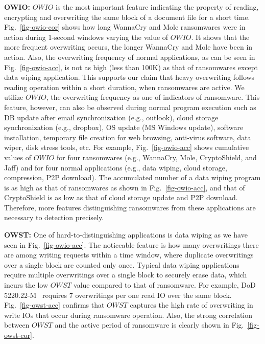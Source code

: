 \documentclass[conference]{IEEEtran}
\newcommand{\eg}{e.g.,\xspace}
\begin{document}
{\bf OWIO:} $OWIO$ is the most important feature indicating the property of reading, encrypting and overwriting 
the same block of a document file for a short time. 
Fig.~\ref{fig-owio-cor} shows how long WannaCry and Mole ransomwares were in action 
during 1-second windows varying the value of $OWIO$. 
It shows that the more frequent overwriting occurs, the longer WannaCry and Mole have been in action.
Also, the overwriting frequency of normal applications, as can be seen in Fig.~\ref{fig-owio-acc}, 
is not as high (less than 100K) as that of ransomwares except data wiping application. 
This supports our claim that heavy overwriting follows reading operation within a short duration,
when ransomwares are active. We utilize $OWIO$, the overwriting frequency as one of indicators of ransomware.
This feature, however, can also be observed during normal program execution such as DB update
after email synchronization (\eg outlook), cloud storage synchronization (\eg dropbox),
OS update (MS Windows update), software installation, temporary file creation for web browsing,
anti-virus software, data wiper, disk stress tools, etc. For example, 
Fig.~\ref{fig-owio-acc} shows cumulative values
of $OWIO$ for four ransomwares (\eg WannaCry, Mole, CryptoShield, and Jaff) 
and for four normal applications (\eg data wiping, cloud storage, compression, P2P download).
The accumulated number of a data wiping program is 
as high as that of ransomwares as shown in Fig.~\ref{fig-owio-acc},
and that of CryptoShield is as low as that of cloud storage update and P2P download.
Therefore, more features distinguishing ransomwares from these applications are necessary
to detection precisely. 

{\bf OWST:} One of hard-to-distinguishing applications is data wiping as we have seen in Fig.~\ref{fig-owio-acc}.
The noticeable feature is how many overwritings 
there are among writing requests within a time window,
where duplicate overwritings over a single block are counted only once.
Typical data wiping applications require multiple overwritings over a single block to securely erase data,
which incurs the low $OWST$ value compared to that of ransomware. For example, DoD 5220.22-M~\cite{DoD5220} requires
7 overwritings per one read IO over the same block. Fig.~\ref{fig-owst-acc} confirms 
that $OWST$ captures the high rate of overwriting in write IOs that occur during ransomware operation.
Also, the strong correlation between $OWST$ and the active period of ransomware is clearly shown in Fig.~\ref{fig-owst-cor}.
\end{document}

